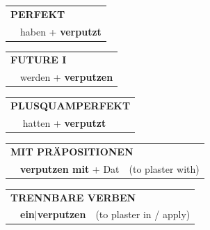 \documentclass[10pt,a4paper]{revtex4-2}
\begin{document}
\begin{verbbox}
 \begin{tabular}{rl}
     \multicolumn{2}{l}{\textbf{PERFEKT}}\\
   & haben + \textbf{verputzt}\\
  \end{tabular}
\hfill
\begin{tabular}{rl}
    \multicolumn{2}{l}{\textbf{FUTURE I}}\\
   & werden + \textbf{verputzen}\\
  \end{tabular}
\hfill
\begin{tabular}{rl}
    \multicolumn{2}{l}{\textbf{PLUSQUAMPERFEKT}}\\
   & hatten + \textbf{verputzt}\\
  \end{tabular}

 \vspace{10pt}

\begin{tabular}{lll}
      \multicolumn{3}{l}{\textbf{MIT PRÄPOSITIONEN}}\\
& \textbf{verputzen mit} + Dat & (to plaster with)\\
\end{tabular}
  \hfill
\begin{tabular}{lll}
      \multicolumn{3}{l}{\textbf{TRENNBARE VERBEN}}\\
 & \textbf{ein$|$verputzen} & (to plaster in / apply)\\
  \end{tabular}


\vspace{-5pt}
\end{verbbox}
\end{document}
